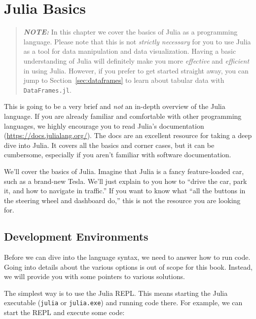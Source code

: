 \documentclass[
  notoc %
]{tufte-book}
\newcommand{\passthrough}[1]{#1}
\begin{document}
\hypertarget{sec:julia_basics}{%
\chapter{Julia Basics}\label{sec:julia_basics}}

\begin{quote}
\textbf{\emph{NOTE:}} In this chapter we cover the basics of Julia as a
programming language. Please note that this is not \emph{strictly
necessary} for you to use Julia as a tool for data manipulation and data
visualization. Having a basic understanding of Julia will definitely
make you more \emph{effective} and \emph{efficient} in using Julia.
However, if you prefer to get started straight away, you can jump to
Section~\ref{sec:dataframes} to learn about tabular data with
\passthrough{\lstinline!DataFrames.jl!}.
\end{quote}

This is going to be a very brief and \emph{not} an in-depth overview of
the Julia language. If you are already familiar and comfortable with
other programming languages, we highly encourage you to read Julia's
documentation (\url{https://docs.julialang.org/}). The docs are an
excellent resource for taking a deep dive into Julia. It covers all the
basics and corner cases, but it can be cumbersome, especially if you
aren't familiar with software documentation.

We'll cover the basics of Julia. Imagine that Julia is a fancy
feature-loaded car, such as a brand-new Tesla. We'll just explain to you
how to ``drive the car, park it, and how to navigate in traffic.'' If
you want to know what ``all the buttons in the steering wheel and
dashboard do,'' this is not the resource you are looking for.

\hypertarget{sec:ide}{%
\section{Development Environments}\label{sec:ide}}

Before we can dive into the language syntax, we need to answer how to
run code. Going into details about the various options is out of scope
for this book. Instead, we will provide you with some pointers to
various solutions.

The simplest way is to use the Julia REPL. This means starting the Julia
executable (\passthrough{\lstinline!julia!} or
\passthrough{\lstinline!julia.exe!}) and running code there. For
example, we can start the REPL and execute some code:
\end{document}
